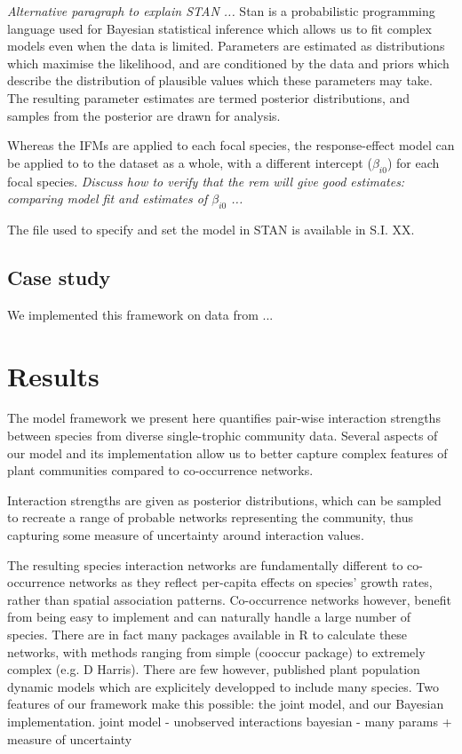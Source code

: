 \documentclass[a4,12pt]{article}
\begin{document}
        \textit{Alternative paragraph to explain STAN ...}
        Stan is a probabilistic programming language used for Bayesian statistical inference which allows us to fit complex models even when the data is limited. Parameters are estimated as distributions which maximise the likelihood, and are conditioned by the data and priors which describe the distribution of plausible values which these parameters may take. The resulting parameter estimates are termed posterior distributions, and samples from the posterior are drawn for analysis.
        
        Whereas the IFMs are applied to each focal species, the response-effect model can be applied to to the dataset as a whole, with a different intercept ($\beta_{i0}$) for each focal species. \textit{Discuss how to verify that the rem will give good estimates: comparing model fit and estimates of $\beta_{i0}$ ...}

        The file used to specify and set the model in STAN is available in S.I. XX. 
    
    \subsection{Case study}

        We implemented this framework on data from ...
        

\section{Results}


    The model framework we present here quantifies pair-wise interaction strengths between species from diverse single-trophic community data. Several aspects of our model and its implementation allow us to better capture complex features of plant communities compared to co-occurrence networks. 

    Interaction strengths are given as posterior distributions, which can be sampled to recreate a range of probable networks representing the community, thus capturing some measure of uncertainty around interaction values. 

    The resulting species interaction networks are fundamentally different to co-occurrence networks as they reflect per-capita effects on species' growth rates, rather than spatial association patterns. 
    Co-occurrence networks however, benefit from being easy to implement and can naturally handle a large number of species. There are in fact many  packages available in R to calculate these networks, with methods ranging from simple (cooccur package) to extremely complex (e.g. D Harris). 
    There are few however, published plant population dynamic models which are explicitely developped to include many species. Two features of our framework make this possible: the joint model, and our Bayesian implementation.
    joint model - unobserved interactions 
    bayesian - many params + measure of uncertainty
\end{document}
